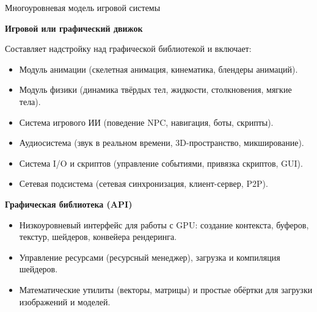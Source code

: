 \documentclass{beamer}
\begin{document}
\begin{frame}{Многоуровневая модель игровой системы}

	\textbf{Игровой или графический движок}

	{\footnotesize
    Составляет надстройку над графической библиотекой и включает:
	
	\begin{itemize}
		\item
		Модуль анимации (скелетная анимация, кинематика, блендеры анимаций).
		\item
		Модуль физики (динамика твёрдых тел, жидкости, столкновения, мягкие тела).
		\item
		Система игрового ИИ (поведение NPC, навигация, боты, скрипты).
		\item
		Аудиосистема (звук в реальном времени, 3D-пространство, микширование).
		\item
		Система I/O и скриптов (управление событиями, привязка скриптов, GUI).
		\item
		Сетевая подсистема (сетевая синхронизация, клиент-сервер, P2P).
	\end{itemize}
	}
	
    \textbf{Графическая библиотека (API)}
	{\footnotesize
    \begin{itemize}
		\item
    	Низкоуровневый интерфейс для работы с GPU: создание контекста, буферов, текстур, шейдеров, конвейера рендеринга.
		\item
    	Управление ресурсами (ресурсный менеджер), загрузка и компиляция шейдеров.
		\item
    	 Математические утилиты (векторы, матрицы) и простые обёртки для загрузки изображений и моделей.
    \end{itemize}
	}

	
\end{frame}
\end{document}
